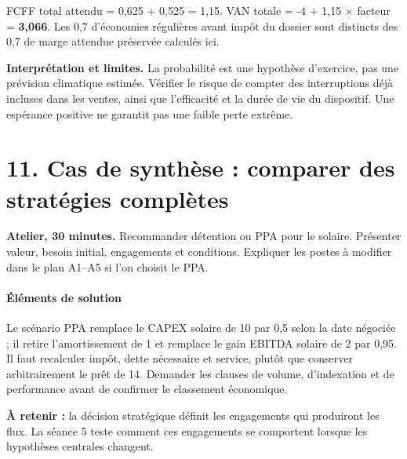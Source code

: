 \documentclass[12pt,a4paper]{article}
\begin{document}
FCFF total attendu = 0,625 + 0,525 = 1,15. VAN totale = -4 + 1,15 $\times$ facteur = \textbf{3,066}. Les 0,7 d’économies régulières avant impôt du dossier sont distincts des 0,7 de marge attendue préservée calculés ici.

\textbf{Interprétation et limites.} La probabilité est une hypothèse d’exercice, pas une prévision climatique estimée. Vérifier le risque de compter des interruptions déjà incluses dans les ventes, ainsi que l’efficacité et la durée de vie du dispositif. Une espérance positive ne garantit pas une faible perte extrême.

\section*{11. Cas de synthèse : comparer des stratégies complètes}
\textbf{Atelier, 30 minutes.} Recommander détention ou PPA pour le solaire. Présenter valeur, besoin initial, engagements et conditions. Expliquer les postes à modifier dans le plan A1--A5 si l’on choisit le PPA.



\paragraph{Éléments de solution}
Le scénario PPA remplace le CAPEX solaire de 10 par 0,5 selon la date négociée ; il retire l’amortissement de 1 et remplace le gain EBITDA solaire de 2 par 0,95. Il faut recalculer impôt, dette nécessaire et service, plutôt que conserver arbitrairement le prêt de 14. Demander les clauses de volume, d’indexation et de performance avant de confirmer le classement économique.


\textbf{À retenir :} la décision stratégique définit les engagements qui produiront les flux. La séance 5 teste comment ces engagements se comportent lorsque les hypothèses centrales changent.
\end{document}
